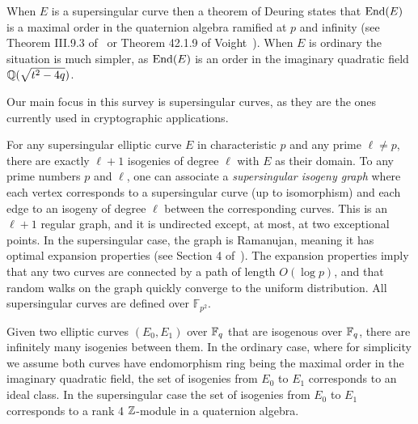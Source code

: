When $E$ is a supersingular curve then a theorem of Deuring states that $\text{End}(E)$ is a maximal order in the quaternion algebra ramified at $p$ and infinity (see Theorem III.9.3 of~\cite{Silverman} or Theorem 42.1.9 of Voight~\cite{Voi21}).
When $E$ is ordinary the situation is much simpler, as $\text{End}(E)$ is an order in the imaginary quadratic field $\mathbb{Q}( \sqrt{t^2-4q})$.


Our main focus in this survey is supersingular curves, as they are the ones currently used in cryptographic applications.

For any supersingular elliptic curve $E$ in characteristic $p$ and any prime $\ell \ne p$, there are exactly $\ell+1$ isogenies of degree $\ell$ with $E$ as their domain. 
%
To any prime numbers $p$ and $\ell$, one can associate a \emph{supersingular isogeny graph} where each vertex corresponds to a supersingular curve (up to isomorphism) and each edge to an isogeny of degree $\ell$ between the corresponding curves. This is an $\ell+1$ regular graph, and it is undirected except, at most, at two exceptional points.
%
In the supersingular case, the graph is Ramanujan, meaning it has optimal expansion properties (see Section 4 of~\cite{CGL}). The expansion properties imply that any two curves are connected by a path of length  $O(\log p)$, and that random walks on the graph quickly converge to the uniform distribution. 
%
All supersingular curves are defined over $\mathbb{F}_{p^2}$.



Given two elliptic curves $(E_0, E_1 )$ over $
\mathbb{F}_q$ that are isogenous over $\mathbb{F}_q$, there are infinitely many isogenies between them.
In the ordinary case, where for simplicity we assume both curves have endomorphism ring being the maximal order in the imaginary quadratic field, the set of isogenies from $E_0$ to $E_1$ corresponds to an ideal class. In the supersingular case the set of isogenies from $E_0$ to $E_1$ corresponds to a rank 4 $\mathbb{Z}$-module in a quaternion algebra.


